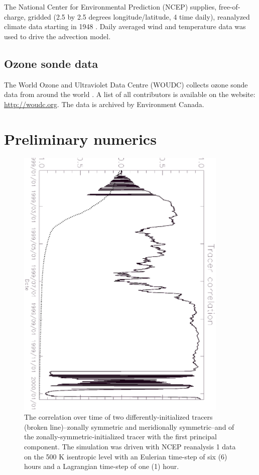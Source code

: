 \documentclass{article}
\begin{document}
The National Center for Environmental Prediction (NCEP) supplies, 
free-of-charge,
gridded (2.5 by 2.5 degrees longitude/latitude, 4 time daily), reanalyzed 
climate data starting in 1948 \citep{Kalnay_etal1996}.
Daily averaged wind and temperature data was used to drive the advection model.

\subsection{Ozone sonde data}

The World Ozone and Ultraviolet Data Centre (WOUDC) collects ozone sonde data
from around the world \citep{Hare_etal2000}. A list of all contributors is available on the website:
\url{http://woudc.org}.
The data is archived by Environment Canada.


\section{Preliminary numerics}

\begin{figure}
\begin{center}
\includegraphics[angle=90,width=0.9\textwidth]{../pc_proxy/tcorr.eps}
\caption{The correlation over time of two differently-initialized tracers
(broken line)--zonally symmetric and meridionally symmetric--and of
the zonally-symmetric-initialized tracer with the first principal component.
The simulation was driven with NCEP reanalysis 1 data on the 500 K isentropic
level with an Eulerian time-step of six (6) hours and a Lagrangian time-step
of one (1) hour.}\label{tcorr}
\end{center}
\end{figure}
\end{document}
